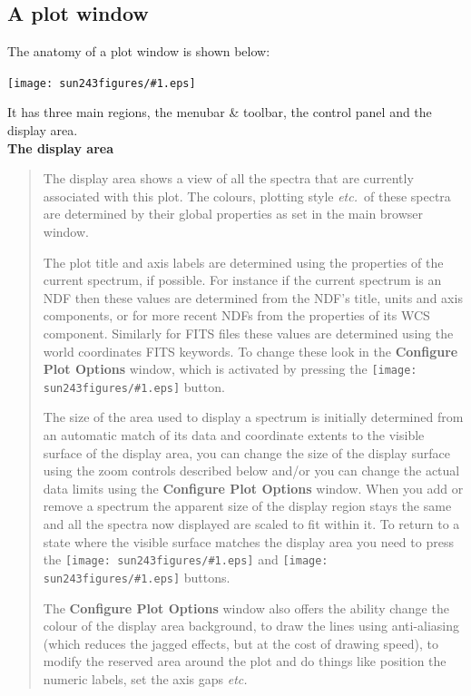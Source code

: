 \documentclass[twoside,11pt]{article}
\newcommand{\htmladdimg}[1]{}
\newcommand{\latexhtml}[2]{#1}
\newcommand{\xlabel}[1]{}
\renewcommand{\_}{\texttt{\symbol{95}}}
\newcommand{\mainfigure}[1]
{\begin{center}
 \latexhtml{\texttt{[image: sun243\_figures/\#1.eps]}}{\htmladdimg{#1.gif}}
 \end{center}
}
\newcommand{\inline}[1]
        {\latexhtml{\texttt{[image: sun243\_figures/\#1.eps]}}
        {\htmladdimg[align=center]{#1.gif}}}
\newcommand{\labelitem}[1]{\textbf{#1}}
\newcommand{\etc}{\textit{etc.}}
\newcommand{\subheading}[1]{\textbf{\large{#1}}}
\begin{document}
\newpage
\subsection{A plot window\xlabel{plot_window}}

The anatomy of a plot window is shown below:

\mainfigure{plot3}

It has three main regions, the menubar \& toolbar, the control panel and
the display area.\\

\subheading{The display area}
\begin{quote}
 The display area shows a view of all the spectra that are currently
 associated with this plot. The colours, plotting style \etc\ of these
 spectra are determined by their global properties as set in the main
 browser window.

 The plot title and axis labels are determined using the properties of the
 current spectrum, if possible. For instance if the current spectrum is an NDF
 then these values are determined from the NDF's title, units and axis
 components, or for more recent NDFs from the properties of its WCS
 component. Similarly for FITS files these values are determined using the
 world coordinates FITS keywords. To change these look in the
 \labelitem{Configure Plot Options} window, which is activated by pressing the
 \inline{config} button.

 The size of the area used to display a spectrum is initially determined from
 an automatic match of its data and coordinate extents to the visible surface
 of the display area, you can change the size of the display surface using the
 zoom controls described below and/or you can change the actual data limits
 using the \labelitem{Configure Plot Options} window. When you add or remove a
 spectrum the apparent size of the display region stays the same and all the
 spectra now displayed are scaled to fit within it. To return to a state where
 the visible surface matches the display area you need to press the
 \inline{fitwidth} and \inline{fitheight} buttons.

 The \labelitem{Configure Plot Options} window also offers the ability change
 the colour of the display area background, to draw the lines using
 anti-aliasing (which reduces the jagged effects, but at the cost of drawing
 speed), to modify the reserved area around the plot and do things like
 position the numeric labels, set the axis gaps \etc\


\end{quote}
\end{document}

